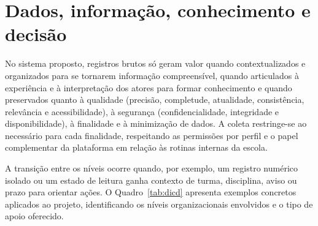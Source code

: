 \documentclass[a4paper,12pt]{report}
\begin{document}
\section{Dados, informação, conhecimento e decisão}

No sistema proposto, registros brutos só geram valor quando contextualizados e organizados para se tornarem informação compreensível, quando articulados à experiência e à interpretação dos atores para formar conhecimento e quando preservados quanto à qualidade (precisão, completude, atualidade, consistência, relevância e acessibilidade), à segurança (confidencialidade, integridade e disponibilidade), à finalidade e à minimização de dados. A coleta restringe-se ao necessário para cada finalidade, respeitando as permissões por perfil e o papel complementar da plataforma em relação às rotinas internas da escola.

A transição entre os níveis ocorre quando, por exemplo, um registro numérico isolado ou um estado de leitura ganha contexto de turma, disciplina, aviso ou prazo para orientar ações. O Quadro~\ref{tab:dicd} apresenta exemplos concretos aplicados ao projeto, identificando os níveis organizacionais envolvidos e o tipo de apoio oferecido.
\end{document}
